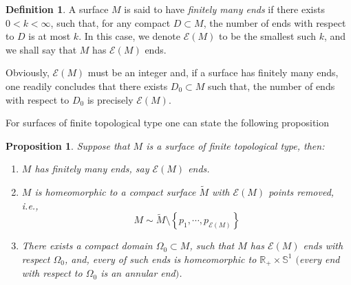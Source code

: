 \documentclass[a4paper]{amsart}
\newtheorem{proposition}[theorem]{Proposition}
\theoremstyle{definition}
\newtheorem{definition}[theorem]{Definition}
\numberwithin{equation}{section}
\begin{document}
\begin{definition}\label{def-ends}A surface $M$ is said to have \emph{finitely many ends} if there exists $0<k<\infty$, such that, for any compact $D\subset M$, the number of  ends with respect to $D$ is at most $k$. In this case, we denote ${\mathcal{E}}(M)$ to be the smallest such $k$, and we shall say that $M$ has ${\mathcal{E}}(M)$ ends.
\end{definition}

Obviously, ${\mathcal{E}}(M)$ must be an integer and, if a surface has finitely many ends, one readily concludes that there exists $D_0\subset M$ such that, the number of ends with respect to $D_0$ is precisely ${\mathcal{E}}(M)$.  

For surfaces of finite topological type one can state the following proposition
\begin{proposition}
Suppose that $M$ is a surface of finite topological type, then:
\begin{enumerate}
\item $M$ has finitely many ends, say ${\mathcal{E}}(M)$ ends.
\item $M$ is homeomorphic to a compact surface $\widetilde M$ with ${\mathcal{E}}(M)$ points removed, \emph{i.e.},
$$
M\sim \widetilde M\setminus\left\{ p_1,\cdots,p_{{\mathcal{E}}(M)}\right\}
$$
\item There exists a compact domain $\Omega_0\subset M$, such that $M$ has ${\mathcal{E}}(M)$ ends with respect $\Omega_0$, and, every of such ends is homeomorphic to ${\mathbb{R}}_+\times \mathbb{S}^1$ $($every end with respect to $\Omega_0$ is an annular end$)$.
\end{enumerate}
\end{proposition}
\end{document}
